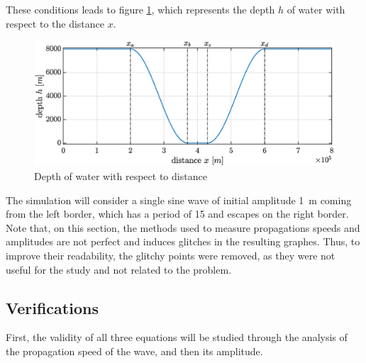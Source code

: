 \documentclass[a4paper,12pt,twoside]{article}
\begin{document}
      These conditions leads to figure \ref{fig:tsunami-depth}, which represents the depth $h$ of water with respect to the distance $x$.

      \begin{figure}[h]
        \centering
        \includegraphics[width=\textwidth]{graphs/tsunami_depth.eps}
        \caption{Depth of water with respect to distance}
        \label{fig:tsunami-depth}
      \end{figure}

      The simulation will consider a single sine wave of initial amplitude \SI{1}{\meter} coming from the left border, which has a period of \SI{15}{\min} and escapes on the right border.\\

      Note that, on this section, the methods used to measure propagations speeds and amplitudes are not perfect and induces glitches in the resulting graphes.
      Thus, to improve their readability, the glitchy points were removed, as they were not useful for the study and not related to the problem.\\

      \subsection{Verifications} %
      First, the validity of all three equations will be studied through the analysis of the propagation speed of the wave, and then its amplitude.
\end{document}
